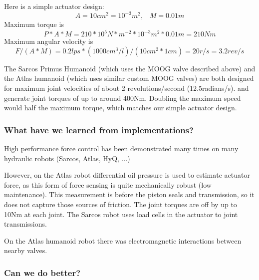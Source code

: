 \documentclass[letterpaper,12pt,fullpage]{article}
\begin{document}
Here is a simple actuator design:
\begin{equation}
A = 10cm^2 = 10^{-3}m^2, \; \; \; M = 0.01m
\end{equation}
Maximum torque is
\begin{equation}
P*A*M = 210*10^5N*m^{-2}*10^{-3}m^2*0.01m = 210Nm 
\end{equation}
Maximum angular velocity is
\begin{equation}
F/(A*M) = 0.2lps*(1000cm^3/l)/(10cm^2*1cm) = 20r/s = 3.2rev/s
\end{equation}

The Sarcos Primus Humanoid (which uses the MOOG valve described
above) and the Atlas humanoid (which uses similar custom MOOG valves)
are both designed
for maximum joint velocities of about 2 revolutions/second (12.5radians/s).
and generate joint torques of up to around 400Nm.
Doubling the maximum speed would half the maximum torque, which matches
our simple actuator design.

\subsubsection{What have we learned from implementations?}

High performance force control has been demonstrated many times
on many hydraulic robots (Sarcos, Atlas, HyQ, ...)

However, on the Atlas robot differential oil pressure is used
to estimate actuator force, as this form of force sensing
is quite mechanically robust (low maintenance).
This measurement is before the piston
seals and transmission, so it does not capture those sources
of friction. The joint torques are off by up to 10Nm at each joint.
The Sarcos robot uses load cells in the actuator to joint transmissions.

On the Atlas humanoid robot there was electromagnetic interactions between
nearby valves.

\subsubsection{Can we do better?}
\end{document}
